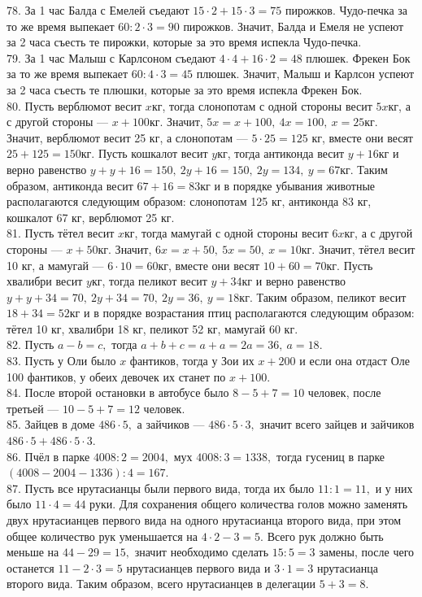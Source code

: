 \documentclass[12pt]{article}
\begin{document}
78. За 1 час Балда с Емелей съедают $15\cdot2+15\cdot3=75$ пирожков. Чудо-печка за то же время выпекает $60:2\cdot3=90$ пирожков. Значит, Балда и Емеля не успеют за 2 часа съесть те пирожки, которые за это время испекла Чудо-печка.\\
79. За 1 час Малыш с Карлсоном съедают $4\cdot4+16\cdot2=48$ плюшек. Фрекен Бок за то же время выпекает $60:4\cdot3=45$ плюшек. Значит, Малыш и Карлсон успеют за 2 часа съесть те плюшки, которые за это время испекла Фрекен Бок.\\
80. Пусть верблюмот весит $x$кг, тогда слонопотам с одной стороны весит $5x$кг, а с другой стороны --- $x+100$кг. Значит, $5x=x+100,\ 4x=100,\ x=25$кг. Значит, верблюмот весит 25 кг, а слонопотам --- $5\cdot25=125$ кг, вместе они весят $25+125=150$кг. Пусть кошкалот весит $y$кг, тогда антиконда весит $y+16$кг и верно равенство $y+y+16=150,\ 2y+16=150,\ 2y=134,\ y=67$кг. Таким образом, антиконда весит $67+16=83$кг и в порядке убывания животные располагаются следующим образом: слонопотам 125 кг, антиконда 83 кг, кошкалот 67 кг, верблюмот 25 кг.\\
81. Пусть тётел весит $x$кг, тогда мамугай с одной стороны весит $6x$кг, а с другой стороны --- $x+50$кг. Значит, $6x=x+50,\ 5x=50,\ x=10$кг. Значит, тётел весит 10 кг, а мамугай --- $6\cdot10=60$кг, вместе они весят $10+60=70$кг. Пусть хвалибри весит $y$кг, тогда пеликот весит $y+34$кг и верно равенство $y+y+34=70,\ 2y+34=70,\ 2y=36,\ y=18$кг. Таким образом, пеликот весит $18+34=52$кг и в порядке возрастания птиц располагаются следующим образом: тётел 10 кг, хвалибри 18 кг, пеликот 52 кг, мамугай 60 кг.\\
82. Пусть $a-b=c,$ тогда $a+b+c=a+a=2a=36,\ a=18.$\\
83. Пусть у Оли было $x$ фантиков, тогда у Зои их $x+200$ и если она отдаст Оле 100 фантиков, у обеих девочек их станет по $x+100.$\\
84. После второй остановки в автобусе было $8-5+7=10$ человек, после третьей --- $10-5+7=12$ человек.\\
85. Зайцев в доме $486\cdot5,$ а зайчиков --- $486\cdot5\cdot3,$ значит всего зайцев и зайчиков $486\cdot5+486\cdot5\cdot3.$\\
86. Пчёл в парке $4008:2=2004,$ мух $4008:3=1338,$ тогда гусениц в парке $(4008-2004-1336):4=167.$\\
87. Пусть все нрутасианцы были первого вида, тогда их было $11:1=11,$ и у них было $11\cdot4=44$ руки. Для сохранения общего количества голов можно заменять двух нрутасианцев первого вида на одного нрутасианца второго вида, при этом общее количество рук уменьшается на $4\cdot2-3=5.$ Всего рук должно быть меньше на  $44-29=15,$ значит необходимо сделать $15:5=3$ замены, после чего останется $11-2\cdot3=5$ нрутасианцев первого вида и $3\cdot1=3$ нрутасианца второго вида. Таким образом, всего нрутасианцев в делегации $5+3=8.$\\
\end{document}
